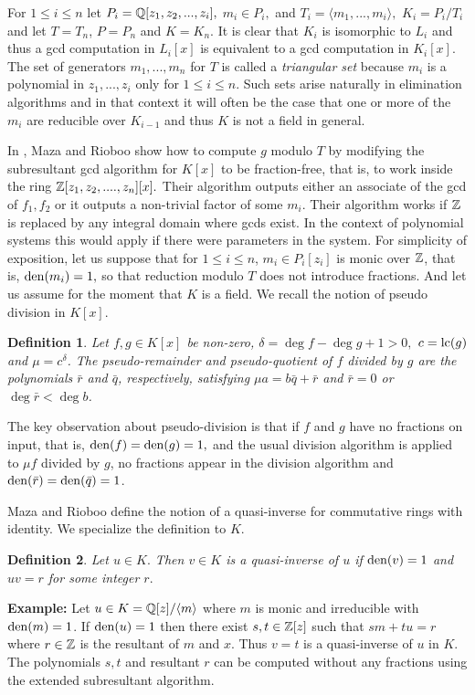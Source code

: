 \documentclass[10pt]{article}
\newtheorem{definition}{Definition}
\begin{document}
For $1 \le i \le n$ let $P_i={\mathbb Q}[z_1,z_2,...,z_i],$ $m_i \in P_i,$ and
$T_i = \langle m_1, ..., m_i \rangle,$ $K_i = P_i/T_i$ and
let $T = T_n$, $P = P_n$ and $K = K_n.$
It is clear that $K_i$ is isomorphic to $L_i$ and thus a
gcd computation in $L_i[x]$ is equivalent to a gcd computation in $K_i[x]$.
The set of generators $m_1, ..., m_n$ for $T$ is called a {\it triangular set}
because $m_i$ is a polynomial in $z_1, ..., z_i$ only for $1 \le i \le n$.
Such sets arise naturally in elimination algorithms and in that context it will
often be the case that one or more of the $m_i$ are reducible over $K_{i-1}$
and thus $K$ is not a field in general.



In \cite{Maza}, Maza and Rioboo show how to compute $g$ modulo $T$ by modifying the
subresultant gcd algorithm for $K[x]$ to be fraction-free, that is, to work
inside the ring ${\mathbb Z}[z_1,z_2,....,z_n][x].$ Their algorithm outputs either
an associate of the gcd of $f_1,f_2$ or it outputs a non-trivial factor
of some $m_i.$  Their algorithm works if ${\mathbb Z}$ is replaced by any integral
domain where gcds exist.  In the context of polynomial systems
this would apply if there were parameters in the system.
For simplicity of exposition, let us suppose that for $1 \le i \le n$,
$m_i \in P_i[z_i]$ is monic over ${\mathbb Z}$, that is, ${\rm den}(m_i) = 1,$
so that reduction modulo $T$ does not introduce fractions.
And let us assume for the moment that $K$ is a field.
We recall the notion of pseudo division in $K[x].$

\begin{definition}
Let $f, g \in K[x]$ be non-zero, $\delta = \deg f - \deg g + 1 > 0,$
$c = {\rm lc}(g)$ and $\mu = c^{\delta}$.
The {\it pseudo-remainder} and {\it pseudo-quotient} of $f$ divided by $g$
are the polynomials $\bar r$ and $\bar q$, respectively, satisfying
$\mu a = b \bar q + \bar r$ and $\bar r = 0$ or $\deg \bar r < \deg b$.
\end{definition}
The key observation about pseudo-division is that if $f$ and $g$ have
no fractions on input, that is, ${\rm den}(f) = {\rm den}(g) = 1,$ and the
usual division algorithm is applied to $\mu f$ divided by $g$, no fractions
appear in the division algorithm and ${\rm den}(\bar r) = {\rm den}(\bar q) = 1$.

Maza and Rioboo define the notion of a quasi-inverse for commutative
rings with identity.  We specialize the definition to $K.$
\begin{definition}
Let $u \in K.$  Then $v \in K$ is a
{\it quasi-inverse} of $u$ if ${\rm den}(v) = 1$ and $u v = r$
for some integer $r.$
\end{definition}
\noindent
{\bf Example:} Let $u \in K = {\mathbb Q}[z]/\langle m \rangle$ where $m$ is monic and
irreducible with ${\rm den}(m) = 1$.  If ${\rm den}(u) = 1$ then there exist
$s,t \in {\mathbb Z}[z]$ such that $s m + t u = r$ where $r \in {\mathbb Z}$ is the resultant
of $m$ and $x$.  Thus $v = t$ is a quasi-inverse of $u$ in $K$.
The polynomials $s,t$ and resultant $r$ can be computed without any fractions
using the extended subresultant algorithm.
\end{document}
